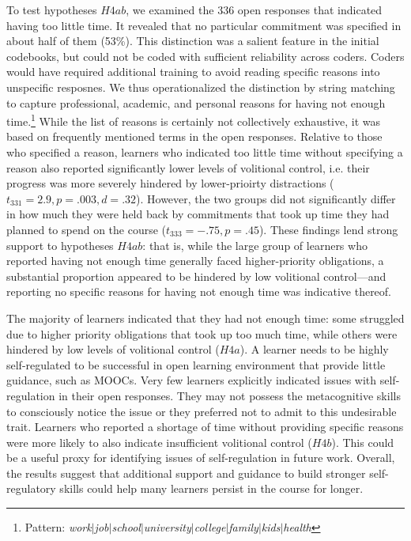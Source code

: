 \documentclass{sigchi}\usepackage[]{graphicx}\usepackage[]{color}
\begin{document}
To test hypotheses $H4ab$, we examined the 336 open responses that indicated having too little time. It revealed that no particular commitment was specified in about half of them (53\%). This distinction was a salient feature in the initial codebooks, but could not be coded with sufficient reliability across coders. Coders would have required additional training to avoid reading specific reasons into unspecific resposnes. We thus operationalized the distinction by string matching to capture professional, academic, and personal reasons for having not enough time.\footnote{Pattern: {\em work$|$job$|$school$|$university$|$college$|$family$|$kids$|$health}} While the list of reasons is certainly not collectively exhaustive, it was based on frequently mentioned terms in the open responses. Relative to those who specified a reason, learners who indicated too little time without specifying a reason also reported significantly lower levels of volitional control, i.e. their progress was more severely hindered by lower-prioirty distractions ($t_{331}=2.9, p=.003, d=.32$). However, the two groups did not significantly differ in how much they were held back by commitments that took up time they had planned to spend on the course ($t_{333}=-.75, p=.45$). These findings lend strong support to hypotheses $H4ab$: that is, while the large group of learners who reported having not enough time generally faced higher-priority obligations, a substantial proportion appeared to be hindered by low volitional control---and reporting no specific reasons for having not enough time was indicative thereof. 

The majority of learners indicated that they had not enough time: some struggled due to higher priority obligations that took up too much time, while others were hindered by low levels of volitional control ($H4a$). A learner needs to be highly self-regulated to be successful in open learning environment that provide little guidance, such as MOOCs. Very few learners explicitly indicated issues with self-regulation in their open responses. They may not possess the metacognitive skills to consciously notice the issue or they preferred not to admit to this undesirable trait. Learners who reported a shortage of time without providing specific reasons were more likely to also indicate insufficient volitional control ($H4b$). This could be a useful proxy for identifying issues of self-regulation in future work. Overall, the results suggest that additional support and guidance to build stronger self-regulatory skills could help many learners persist in the course for longer.
\end{document}

